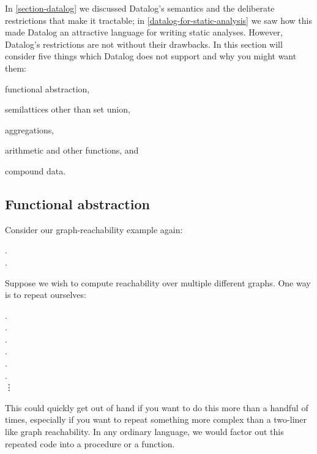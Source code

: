 In \cref{section-datalog} we discussed Datalog's semantics and the deliberate
restrictions that make it tractable; in \cref{datalog-for-static-analysis} we saw how this made Datalog an attractive language for writing static analyses. However, Datalog's restrictions are not without their drawbacks. In this section will consider five things which Datalog does not support and why you might want them:
\begin{enumerate*}[label=({\arabic*})]
  \item functional abstraction,
  \item semilattices other than set union,
  \item aggregations,
  \item arithmetic and other functions, and
  \item compound data.
\end{enumerate*}


\subsection{Functional abstraction}

Consider our graph-reachability example again:

\begin{datalog}
  .\\
   \gets {} \conj {}.
\end{datalog}

\noindent
Suppose we wish to compute reachability over multiple different graphs. One way is to repeat ourselves:

\nopagebreak[2]
\begin{datalog}
  .\\
   \gets {} \conj {}.
  \\[1ex]
  .\\
   \gets {} \conj {}.
  \\[1ex]
  .\\
   \gets {} \conj {}.
  \\
  \qquad\vdots
\end{datalog}

\noindent
This could quickly get out of hand if you want to do this more than a handful of
times, especially if you want to repeat something more complex than a two-liner
like graph reachability.
%
In any ordinary language, we would factor out this repeated code into a procedure or a function.

